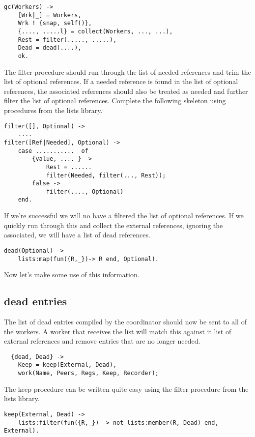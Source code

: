 \documentclass[a4paper,11pt]{article}
\begin{document}
\begin{verbatim}
gc(Workers) ->
    [Wrk|_] = Workers,
    Wrk ! {snap, self()},
    {...., .....l} = collect(Workers, ..., ...),
    Rest = filter(....., .....),
    Dead = dead(....),
    ok.
\end{verbatim}

The filter procedure should run through the list of needed references
and trim the list of optional references. If a needed reference is
found in the list of optional references, the associated 
references should also be treated as needed and further filter the
list of optional references. Complete the following skeleton using
procedures from the lists library.

\begin{verbatim}            
filter([], Optional) ->
    ....
filter([Ref|Needed], Optional) ->
    case ...........  of
        {value, .... } ->
            Rest = ......
            filter(Needed, filter(..., Rest));
        false ->
            filter(...., Optional)
    end.
\end{verbatim}

If we're successful we will no have a filtered the list of optional
references. If we quickly run
through this and collect the external references, ignoring the
associated, we will have a list of dead references. 

\begin{verbatim}
dead(Optional) ->
    lists:map(fun({R,_})-> R end, Optional).
\end{verbatim}

Now let's make some use of this information. 

\subsection{dead entries}

The list of dead entries compiled by the coordinator should now be
sent to all of the workers. A worker that receives the list will match
this against it list of external references and remove entries that
are no longer needed.

\begin{verbatim}
  {dead, Dead} ->
    Keep = keep(External, Dead),
    work(Name, Peers, Regs, Keep, Recorder);
\end{verbatim}

The keep procedure can be written quite easy using the filter
procedure from the lists library. 

\begin{verbatim}
keep(External, Dead) ->
    lists:filter(fun({R,_}) -> not lists:member(R, Dead) end, External).
\end{verbatim}
\end{document}
